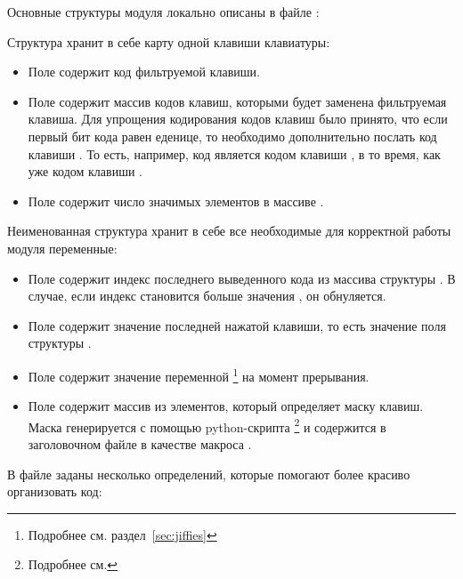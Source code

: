 Основные структуры модуля локально описаны в файле :

Структура  хранит в себе карту одной клавиши клавиатуры:
\begin{itemize}
	\item Поле  содержит код фильтруемой клавиши.
	\item Поле  содержит массив кодов клавиш, которыми будет
		заменена фильтруемая клавиша. Для упрощения 
		кодирования кодов клавиш было принято, что если первый бит кода равен еденице, 
		то необходимо дополнительно послать код клавиши . То есть, например,
		код  является кодом клавиши , в то время, как  уже кодом
		клавиши \key{)}.
	\item Поле  содержит число значимых элементов в массиве .
\end{itemize}
Неименованная структура хранит в себе все необходимые для корректной работы модуля переменные:
\begin{itemize}
	\item Поле  содержит индекс последнего выведенного кода из массива
		 структуры . В случае, если индекс становится больше значения 
		, он обнуляется.
	\item Поле  содержит значение последней нажатой клавиши, то есть значение поля
		 структуры .
	\item Поле  содержит значение переменной \footnote{Подробнее см. раздел~\ref{sec:jiffies}}
		на момент прерывания.
	\item Поле  содержит массив из  элементов, который определяет
		маску клавиш. Маска генерируется с помощью python-скрипта \footnote{Подробнее см. }
		и содержится в заголовочном файле  в качестве макроса .
\end{itemize}

В файле  заданы несколько определений, которые помогают более красиво организовать код:


